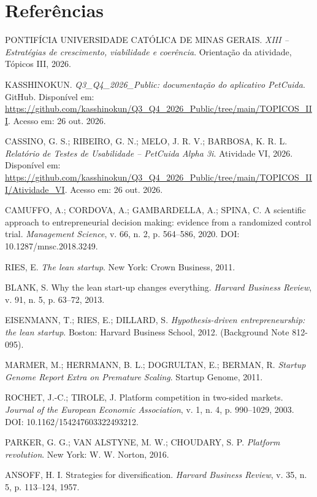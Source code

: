 \section*{Referências}
\small\singlespacing
\begin{enumerate}[label={[\arabic*]},leftmargin=1.1cm,itemsep=0.35em]
\item PONTIFÍCIA UNIVERSIDADE CATÓLICA DE MINAS GERAIS. \textit{XIII -- Estratégias de crescimento, viabilidade e coerência}. Orientação da atividade, Tópicos III, 2026.
\item KASSHINOKUN. \textit{Q3\_Q4\_2026\_Public: documentação do aplicativo PetCuida}. GitHub. Disponível em: \url{https://github.com/kasshinokun/Q3_Q4_2026_Public/tree/main/TOPICOS_III}. Acesso em: 26 out. 2026.
\item CASSINO, G. S.; RIBEIRO, G. N.; MELO, J. R. V.; BARBOSA, K. R. L. \textit{Relatório de Testes de Usabilidade -- PetCuida Alpha 3i}. Atividade VI, 2026. Disponível em: \url{https://github.com/kasshinokun/Q3_Q4_2026_Public/tree/main/TOPICOS_III/Atividade_VI}. Acesso em: 26 out. 2026.
\item CAMUFFO, A.; CORDOVA, A.; GAMBARDELLA, A.; SPINA, C. A scientific approach to entrepreneurial decision making: evidence from a randomized control trial. \textit{Management Science}, v. 66, n. 2, p. 564--586, 2020. DOI: 10.1287/mnsc.2018.3249.
\item RIES, E. \textit{The lean startup}. New York: Crown Business, 2011.
\item BLANK, S. Why the lean start-up changes everything. \textit{Harvard Business Review}, v. 91, n. 5, p. 63--72, 2013.
\item EISENMANN, T.; RIES, E.; DILLARD, S. \textit{Hypothesis-driven entrepreneurship: the lean startup}. Boston: Harvard Business School, 2012. (Background Note 812-095).
\item MARMER, M.; HERRMANN, B. L.; DOGRULTAN, E.; BERMAN, R. \textit{Startup Genome Report Extra on Premature Scaling}. Startup Genome, 2011.
\item ROCHET, J.-C.; TIROLE, J. Platform competition in two-sided markets. \textit{Journal of the European Economic Association}, v. 1, n. 4, p. 990--1029, 2003. DOI: 10.1162/154247603322493212.
\item PARKER, G. G.; VAN ALSTYNE, M. W.; CHOUDARY, S. P. \textit{Platform revolution}. New York: W. W. Norton, 2016.
\item ANSOFF, H. I. Strategies for diversification. \textit{Harvard Business Review}, v. 35, n. 5, p. 113--124, 1957.

\end{enumerate}

